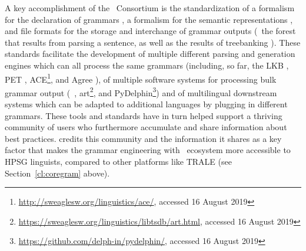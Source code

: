 \documentclass[output=paper,nonflat]{langsci/langscibook}
\begin{document}
A key accomplishment of the \delphin\ Consortium is the standardization
of a formalism for the declaration of grammars
\citep{Copestake:02:CLE}, a formalism for the semantic representations
\citep{CFPS2005a}, and file formats for the storage and interchange of
grammar outputs (\eg\ the forest that results from parsing a sentence,
as well as the results of treebanking \citep{Oepen:01,OFTM2004a-u}).
These standards facilitate the development of multiple different
parsing and generation engines which can all process the same grammars
(including, so far,
the LKB \citep{Copestake2002a},
PET \citep{callmeier00},
ACE\footnote{\url{http://sweaglesw.org/linguistics/ace/}, accessed 16 August 2019},
and Agree \citep{Slayden2012a-u}),
of multiple software systems for processing bulk grammar output
(\itsdb\ \citep{Oepen:01},
art\footnote{\url{https://sweaglesw.org/linguistics/libtsdb/art.html}, accessed 16 August 2019}, and PyDelphin\footnote{\url{https://github.com/delph-in/pydelphin/}, accessed 16 August 2019})
and of multilingual downstream systems which can be adapted to additional
languages by plugging in different grammars.
These tools and standards have in turn helped support a thriving community
of users who furthermore accumulate and share information about best practices.
\citet[234]{MelnikHandWritten} credits this community and the information it
shares as a key factor that makes the grammar engineering with
\delphin\ ecosystem more accessible to HPSG linguists, 
compared to other platforms like TRALE (see Section~\ref{cl:coregram} above).
\end{document}
